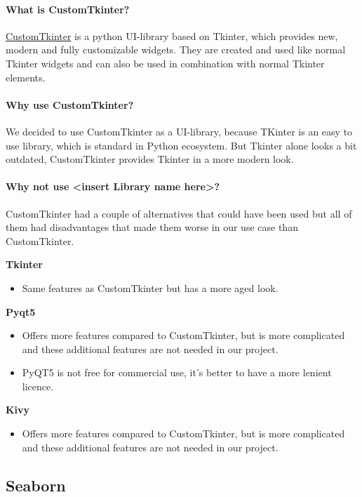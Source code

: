 \documentclass[letterpaper,10pt,english]{sphinxmanual}
\begin{document}
\paragraph{What is CustomTkinter?}
\href{https://github.com/TomSchimansky/CustomTkinter}{CustomTkinter} is a python UI-library based on Tkinter, which provides new, modern and fully customizable widgets. They are created and used like normal Tkinter widgets and can also be used in combination with normal Tkinter elements. 

\paragraph{Why use CustomTkinter?}
We decided to use CustomTkinter as a UI-library, because TKinter is an easy to use library, which is standard in Python ecosystem.
But Tkinter alone looks a bit outdated, CustomTkinter provides Tkinter in a more modern look.

\paragraph{Why not use <insert Library name here>?}
CustomTkinter had a couple of alternatives that could have been used but all of them had disadvantages that made them worse in our use case than CustomTkinter. 
  
\textbf{Tkinter}
\begin{itemize}
    \item Same features as CustomTkinter but has a more aged look.
\end{itemize}
  
\textbf{Pyqt5}
\begin{itemize}
    \item Offers more features compared to CustomTkinter, but is more complicated and these additional features are not needed in our project.
    \item PyQT5 is not free for commercial use, it's better to have a more lenient licence.
\end{itemize}
\textbf{Kivy}
\begin{itemize}
    \item Offers more features compared to CustomTkinter, but is more complicated and these additional features are not needed in our project. 
\end{itemize}

\newpage

\subsection{Seaborn}
\end{document}
